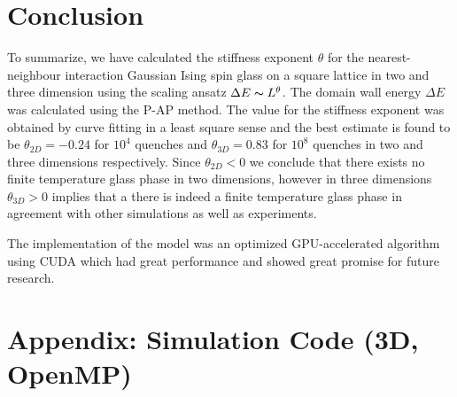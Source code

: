 \documentclass[paper=a4, fontsize=11pt]{scrartcl} %
\numberwithin{equation}{section} %
\numberwithin{figure}{section} %
\numberwithin{table}{section} %
\begin{document}
\section{Conclusion}
\label{sec:conclusions}
To summarize, we have calculated the stiffness exponent $\theta$ for the nearest-neighbour interaction Gaussian Ising spin glass on a square lattice in two and three dimension using the scaling ansatz $\Delta E \thicksim L^\theta$. The domain wall energy $\Delta E$ was calculated using the P-AP method. The value for the stiffness exponent was obtained by curve fitting in a least square sense and the best estimate is found to be $\theta_{2D}=-0.24$ for $10^4$ quenches and $\theta_{3D}=0.83$ for $10^8$ quenches in two and three dimensions respectively. Since $\theta_{2D}<0$ we conclude that there exists no finite temperature glass phase in two dimensions, however in three dimensions $\theta_{3D}>0$ implies that a there is indeed a finite temperature glass phase in agreement with other simulations as well as experiments\cite{hartmann}\cite{fisher}\cite{carter}. 

The implementation of the model was an optimized GPU-accelerated algorithm using CUDA which had great performance and showed great promise for future research.

\pagebreak
\section*{Appendix: Simulation Code (3D, OpenMP)}


\pagebreak
\end{document}

